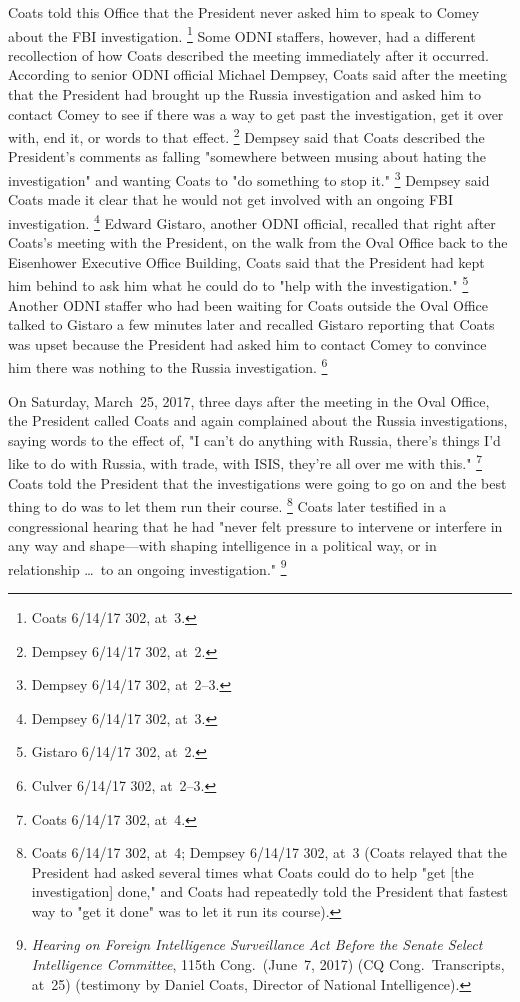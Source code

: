 Coats told this Office that the President never asked him to speak to Comey about the FBI investigation.%
\footnote{Coats 6/14/17 302, at~3.}
Some ODNI staffers, however, had a different recollection of how Coats described the meeting immediately after it occurred.
According to senior ODNI official Michael Dempsey, Coats said after the meeting that the President had brought up the Russia investigation and asked him to contact Comey to see if there was a way to get past the investigation, get it over with, end it, or words to that effect.%
\footnote{Dempsey 6/14/17 302, at~2.}
Dempsey said that Coats described the President's comments as falling "somewhere between musing about hating the investigation" and wanting Coats to "do something to stop it."%
\footnote{Dempsey 6/14/17 302, at~2--3.}
Dempsey said Coats made it clear that he would not get involved with an ongoing FBI investigation.%
\footnote{Dempsey 6/14/17 302, at~3.}
Edward Gistaro, another ODNI official, recalled that right after Coats's meeting with the President, on the walk from the Oval Office back to the Eisenhower Executive Office Building, Coats said that the President had kept him behind to ask him what he could do to "help with the investigation."%
\footnote{Gistaro 6/14/17 302, at~2.}
Another ODNI staffer who had been waiting for Coats outside the Oval Office talked to Gistaro a few minutes later and recalled Gistaro reporting that Coats was upset because the President had asked him to contact Comey to convince him there was nothing to the Russia investigation.%
\footnote{Culver 6/14/17 302, at~2--3.}

On Saturday, March~25, 2017, three days after the meeting in the Oval Office, the President called Coats and again complained about the Russia investigations, saying words to the effect of, "I can't do anything with Russia, there's things I'd like to do with Russia, with trade, with ISIS, they're all over me with this."%
\footnote{Coats 6/14/17 302, at~4.}
Coats told the President that the investigations were going to go on and the best thing to do was to let them run their course.%
\footnote{Coats 6/14/17 302, at~4;
Dempsey 6/14/17 302, at~3 (Coats relayed that the President had asked several times what Coats could do to help "get [the investigation] done," and Coats had repeatedly told the President that fastest way to "get it done" was to let it run its course).}
Coats later testified in a congressional hearing that he had "never felt pressure to intervene or interfere in any way and shape---with shaping intelligence in a political way, or in relationship \dots\ to an ongoing investigation."%
\footnote{\textit{Hearing on Foreign Intelligence Surveillance Act Before the Senate Select Intelligence Committee}, 115th Cong.\ (June~7, 2017) (CQ Cong.\ Transcripts, at~25) (testimony by Daniel Coats, Director of National Intelligence).}

